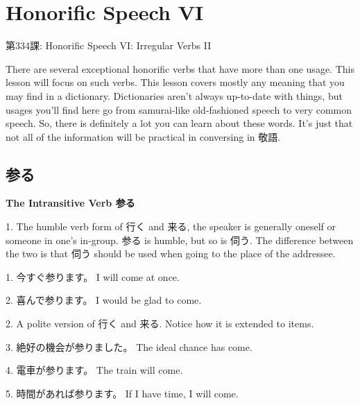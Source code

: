     
\chapter{Honorific Speech VI}

\begin{center}
\begin{Large}
第334課: Honorific Speech VI: Irregular Verbs II 
\end{Large}
\end{center}
 
\par{ There are several exceptional honorific verbs that have more than one usage. This lesson will focus on such verbs. This lesson covers mostly any meaning that you may find in a dictionary. Dictionaries aren't always up-to-date with things, but usages you'll find here go from samurai-like old-fashioned speech to very common speech. So, there is definitely a lot you can learn about these words. It's just that not all of the information will be practical in conversing in 敬語. }
      
\section{参る}
 
\par{\textbf{The Intransitive Verb 参る \hfill\break
}}

\par{1. The humble verb form of 行く and 来る, the speaker is generally oneself or someone in one's in-group. 参る is humble, but so is 伺う. The difference between the two is that 伺う should be used when going to the place of the addressee. }

\par{1. 今すぐ参ります。 \hfill\break
I will come at once. }

\par{2. 喜んで参ります。 \hfill\break
I would be glad to come. }

\par{2. A polite version of 行く and 来る. Notice how it is extended to items. }

\par{3. 絶好の機会が参りました。 \hfill\break
The ideal chance has come. \hfill\break
}

\par{4. 電車が参ります。 \hfill\break
The train will come. \hfill\break
}

\par{5. 時間があれば参ります。 \hfill\break
If I have time, I will come. \hfill\break
}

